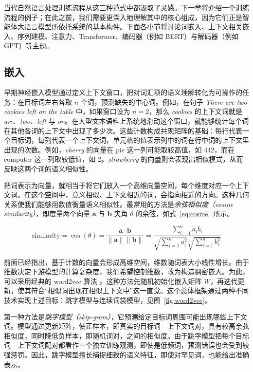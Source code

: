 当代自然语言处理训练流程从这三种范式中都汲取了灵感。下一章将介绍一个训练流程的例子；在此之前，我们需要更深入地理解其中的核心组成，因为它们正是智能体大语言模型所依托系统的基本构件。下面各小节将讨论词嵌入、上下文相关嵌入、序列建模、注意力、Transformer、编码器（例如 BERT）与解码器（例如 GPT）等主题。

\subsection{嵌入}\label{sec:cosine}
早期神经嵌入模型通过定义上下文窗口，把对词汇项的语义理解转化为可操作的任务：在目标词左右各取 $n$ 个词，预测缺失的中心词。例如，在句子 \textit{There are two cookies left on the table} 中，如果窗口设为 $n=2$，那么 \textit{cookies} 的上下文词就是 \textit{are}、\textit{two}、\textit{left} 与 \textit{on}。在大型文本语料上系统地滑动这个窗口，就能够统计每个词在其他各词的上下文中出现了多少次。这些计数构成共现矩阵的基础：每行代表一个目标词，每列代表一个上下文词，单元格的值表示列中的词在行中词的上下文里出现的次数。例如，\textit{cherry} 的向量在 pie 这一列可能取较高值，如 442，而在 computer 这一列取较低值，如 2。\textit{strawberry} 的向量则会表现出相似模式，从而反映这两个词的语义相似性。

把词表示为向量，就相当于将它们放入一个高维向量空间，每个维度对应一个上下文词。在这个空间中，意义相似、上下文相近的词，会指向相近的方向。这种几何关系使我们能够用数值衡量语义相似性。最常用的方法是\emph{余弦相似度（cosine similarity）}，即度量两个向量 $\mathbf{a}$ 与 $\mathbf{b}$ 夹角 $\theta$ 的余弦，如式~\ref{eq:cosine}~所示。

\begin{equation}
    \label{eq:cosine}
\text{similarity} = \cos(\theta) = \frac{\mathbf{a} \cdot \mathbf{b}}{\|\mathbf{a}\| \|\mathbf{b}\|} = \frac{\sum_{i=1}^{n} a_i b_i}{\sqrt{\sum_{i=1}^{n} a_i^2} \sqrt{\sum_{i=1}^{n} b_i^2}}
\end{equation}

前面已经指出，基于计数的向量会形成高维空间，维数随词表大小线性增长。由于维数决定下游模型的计算复杂度，我们希望控制维数，改为构造稠密嵌入。为此，可以采用经典的 word2vec 算法 \citep{mikolov2013efficient}。这种方法先随机初始化嵌入矩阵 $W$，再迭代更新，使其符合“相似词出现在相似上下文中”这一直觉。这个总体框架通过两种不同技术实现上述目标：跳字模型与连续词袋模型，见图~\ref{fig:word2vec}。

第一种方法是\emph{跳字模型（skip-gram）}，它预测给定目标词周围可能出现哪些上下文词。模型通过更新矩阵，使正样本，即真实的目标词—上下文词对，具有较高余弦相似度，同时降低负样本，即随机词对，之间的相似度。由于跳字模型把每个目标词—上下文词配对都看作一个独立训练观测，即使是低频词，预测错误也会受到较强惩罚。因此，跳字模型擅长捕捉细致的语义特征，即使对罕见词，也能给出准确表示。

